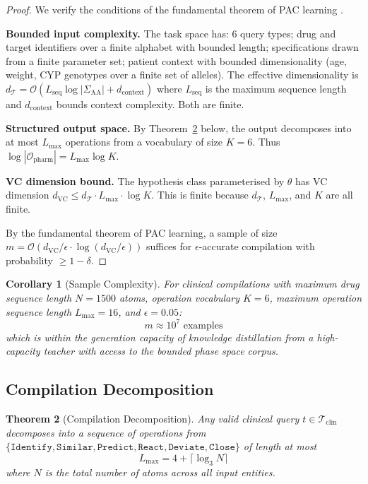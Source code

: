 \documentclass[11pt,twocolumn,a4paper]{article}
\newtheorem{theorem}{Theorem}[section]
\newtheorem{corollary}[theorem]{Corollary}
\theoremstyle{definition}
\theoremstyle{remark}
\newcommand{\params}{\theta}
\newcommand{\taskspace}{\mathcal{T}}
\newcommand{\opspace}{\mathcal{O}}
\begin{document}
\begin{proof}
We verify the conditions of the fundamental theorem of PAC learning \citep{valiant1984}.

\textbf{Bounded input complexity.} The task space has: 6 query types; drug and target identifiers over a finite alphabet with bounded length; specifications drawn from a finite parameter set; patient context with bounded dimensionality (age, weight, CYP genotypes over a finite set of alleles). The effective dimensionality is $d_\taskspace = \mathcal{O}(L_{\mathrm{seq}} \log |\Sigma_{\mathrm{AA}}| + d_{\mathrm{context}})$ where $L_{\mathrm{seq}}$ is the maximum sequence length and $d_{\mathrm{context}}$ bounds context complexity. Both are finite.

\textbf{Structured output space.} By Theorem~\ref{thm:compilation_decomposition} below, the output decomposes into at most $L_{\max}$ operations from a vocabulary of size $K = 6$. Thus $\log |\opspace_{\mathrm{pharm}}| = L_{\max} \log K$.

\textbf{VC dimension bound.} The hypothesis class parameterised by $\params$ has VC dimension $d_{\mathrm{VC}} \leq d_\taskspace \cdot L_{\max} \cdot \log K$. This is finite because $d_\taskspace$, $L_{\max}$, and $K$ are all finite.

By the fundamental theorem of PAC learning, a sample of size $m = \mathcal{O}(d_{\mathrm{VC}}/\epsilon \cdot \log(d_{\mathrm{VC}}/\epsilon))$ suffices for $\epsilon$-accurate compilation with probability $\geq 1 - \delta$.
\end{proof}

\begin{corollary}[Sample Complexity]
\label{cor:sample_complexity}
For clinical compilations with maximum drug sequence length $N = 1500$ atoms, operation vocabulary $K = 6$, maximum operation sequence length $L_{\max} = 16$, and $\epsilon = 0.05$:
\begin{equation}
m \approx 10^7 \text{ examples}
\end{equation}
which is within the generation capacity of knowledge distillation from a high-capacity teacher with access to the bounded phase space corpus.
\end{corollary}

\subsection{Compilation Decomposition}

\begin{theorem}[Compilation Decomposition]
\label{thm:compilation_decomposition}
Any valid clinical query $t \in \taskspace_{\mathrm{clin}}$ decomposes into a sequence of operations from $\{\texttt{Identify}, \texttt{Similar}, \texttt{Predict}, \texttt{React}, \texttt{Deviate}, \texttt{Close}\}$ of length at most
\begin{equation}
L_{\max} = 4 + \lceil \log_3 N \rceil
\end{equation}
where $N$ is the total number of atoms across all input entities.
\end{theorem}
\end{document}

